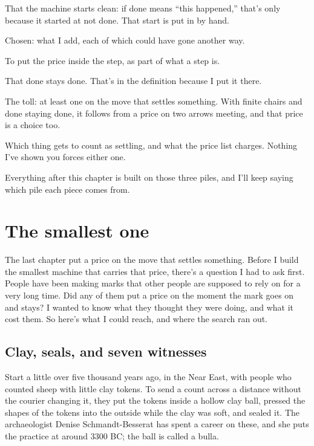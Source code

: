 \documentclass[11pt,twoside]{article}
\theoremstyle{thielethm}
\theoremstyle{thieledef}
\theoremstyle{thieledef}
\theoremstyle{thieledef}
\theoremstyle{thielethm}
\theoremstyle{thieleobs}
\theoremstyle{thielethm}
\begin{document}
That the machine starts clean: if done means ``this happened,'' that's only because it started at not done. That start is put in by hand.

Chosen: what I add, each of which could have gone another way.

To put the price inside the step, as part of what a step is.

That done stays done. That's in the definition because I put it there.

The toll: at least one on the move that settles something. With finite chairs and done staying done, it follows from a price on two arrows meeting, and that price is a choice too.

Which thing gets to count as settling, and what the price list charges. Nothing I've shown you forces either one.

Everything after this chapter is built on those three piles, and I'll keep saying which pile each piece comes from.

\section{The smallest one}
\label{sec:smallest}

The last chapter put a price on the move that settles something. Before I build the smallest machine that carries that price, there's a question I had to ask first. People have been making marks that other people are supposed to rely on for a very long time. Did any of them put a price on the moment the mark goes on and stays? I wanted to know what they thought they were doing, and what it cost them. So here's what I could reach, and where the search ran out.

\subsection{Clay, seals, and seven witnesses}

Start a little over five thousand years ago, in the Near East, with people who counted sheep with little clay tokens. To send a count across a distance without the courier changing it, they put the tokens inside a hollow clay ball, pressed the shapes of the tokens into the outside while the clay was soft, and sealed it. The archaeologist Denise Schmandt-Besserat has spent a career on these, and she puts the practice at around 3300 BC; the ball is called a bulla.
\end{document}
